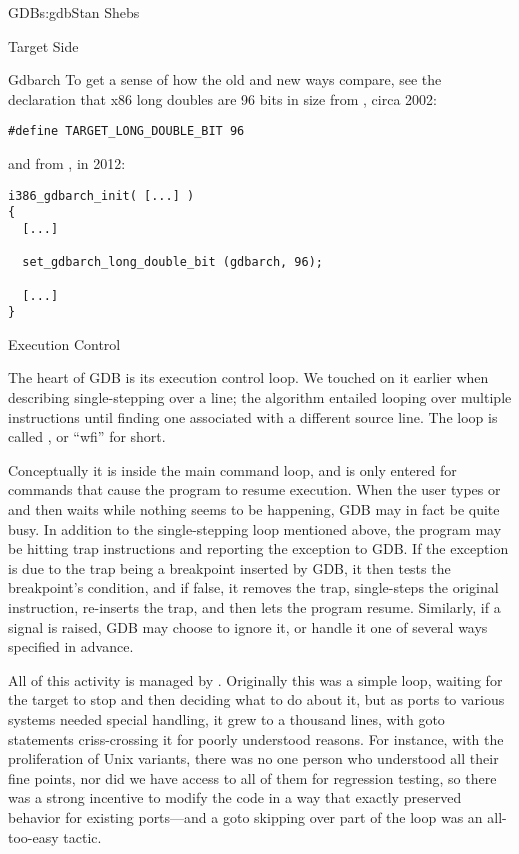 \begin{aosachapter}{GDB}{s:gdb}{Stan Shebs}
\begin{aosasect1}{Target Side}
\begin{aosasect2}{Gdbarch}
To get a sense of how the old and new ways compare, see the
declaration that x86 long doubles are 96 bits in size from
, circa 2002:
\begin{verbatim}
#define TARGET_LONG_DOUBLE_BIT 96
\end{verbatim}
and from , in 2012:
\begin{verbatim}
i386_gdbarch_init( [...] )
{
  [...]

  set_gdbarch_long_double_bit (gdbarch, 96);

  [...]
}
\end{verbatim}

\end{aosasect2}

\begin{aosasect2}{Execution Control}

The heart of GDB is its execution control loop.  We touched on it
earlier when describing single-stepping over a line; the algorithm
entailed looping over multiple instructions until finding one
associated with a different source line.  The loop is called , or ``wfi'' for short.

Conceptually it is inside the main command loop, and is only entered
for commands that cause the program to resume execution.  When the
user types  or  and then waits while nothing
seems to be happening, GDB may in fact be quite busy.  In addition to
the single-stepping loop mentioned above, the program may be hitting
trap instructions and reporting the exception to GDB.  If the
exception is due to the trap being a breakpoint inserted by GDB, it
then tests the breakpoint's condition, and if false, it removes the
trap, single-steps the original instruction, re-inserts the trap, and
then lets the program resume.  Similarly, if a signal is raised, GDB
may choose to ignore it, or handle it one of several ways specified in
advance.

All of this activity is managed by .
Originally this was a simple loop, waiting for the target to stop and
then deciding what to do about it, but as ports to various systems
needed special handling, it grew to a thousand lines, with goto
statements criss-crossing it for poorly understood reasons.  For
instance, with the proliferation of Unix variants, there was no one
person who understood all their fine points, nor did we have access to
all of them for regression testing, so there was a strong incentive to
modify the code in a way that exactly preserved behavior for existing
ports---and a goto skipping over part of the loop was an all-too-easy
tactic.


\end{aosasect2}
\end{aosasect1}
\end{aosachapter}
